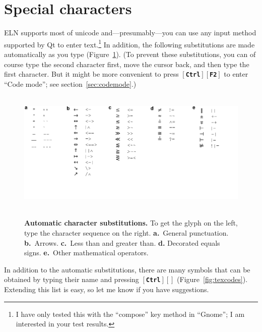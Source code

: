 \documentclass[11pt]{report}
\def\keystroke#1{$\left[\right.\!${\tt\bfseries #1}$\!\left.\right]$}
\def\keycombo#1#2{\keystroke{#1}\keystroke{#2}}
\def\keycontrol#1{\keycombo{Ctrl}{#1}}
\def\keyctrlbackslash{\keycontrol{\char92}}
\begin{document}
\section{Special characters}

ELN supports most of unicode and---presumably---you can use any input
method supported by Qt to enter text.\footnote{I have only tested this
  with the ``compose'' key method in ``Gnome''; I am interested in
  your test results.} In addition, the following substitutions are
made automatically as you type (Figure~\ref{fig:charsubst}).  (To
prevent these substitutions, you can of course type the second
character first, move the cursor back, and then type the first
character. But it might be more convenient to press \keycontrol{F2} to
enter ``Code mode''; see section~\ref{sec:codemode}.)

\begin{figure}[b]
\noindent~\hfill\includegraphics[scale=.85]{../doc/digraphs.pdf}\hfill~\vspace{-40pt}

\caption{{\bf Automatic character substitutions.} To get the glyph on
  the left, type the character sequence on the right. {\bf a.}~General
  punctuation. {\bf b.}~Arrows. {\bf c.}~Less than and greater
  than. {\bf d.} Decorated equals signs. {\bf e.}~Other mathematical
  operators.}\label{fig:charsubst}
\end{figure}

In addition to the automatic substitutions, there are many symbols
that can be obtained by typing their name and pressing
\keyctrlbackslash{} (Figure~\ref{fig:texcodes}).  Extending this list
is easy, so let me know if you have suggestions.
\end{document}
